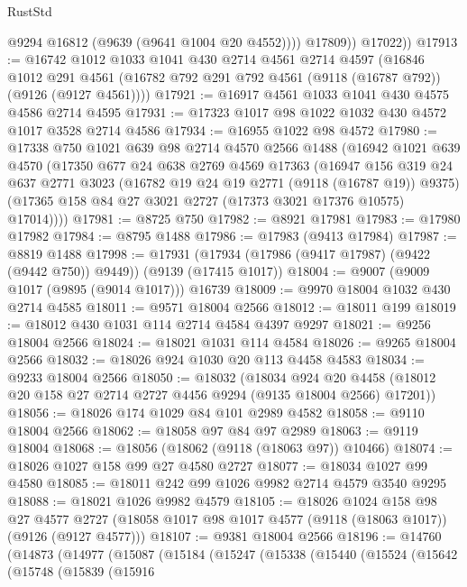 \begin{lexlean}{RustStd}
\begin{coremodule}
                @9294
                @16812
                (@9639 (@9641 @1004 @20 @4552))))
            @17809))
        @17022))
@17913 := @16742
    @1012
    @1033
    @1041
    @430
    @2714
    @4561
    @2714
    @4597
    (@16846
      @1012
      @291
      @4561
      (@16782 @792 @291 @792 @4561 (@9118 (@16787 @792)) (@9126 (@9127 @4561))))
@17921 := @16917 @4561 @1033 @1041 @430 @4575 @4586 @2714 @4595
@17931 := @17323 @1017 @98 @1022 @1032 @430 @4572 @1017 @3528 @2714 @4586
@17934 := @16955 @1022 @98 @4572
@17980 := @17338
    @750
    @1021
    @639
    @98
    @2714
    @4570
    @2566
    @1488
    (@16942
      @1021
      @639
      @4570
      (@17350
        @677
        @24
        @638
        @2769
        @4569
        @17363
        (@16947
          @156
          @319
          @24
          @637
          @2771
          @3023
          (@16782 @19 @24 @19 @2771 (@9118 (@16787 @19)) @9375)
          (@17365 @158 @84 @27 @3021 @2727 (@17373 @3021 @17376 @10575) @17014))))
@17981 := @8725 @750
@17982 := @8921 @17981
@17983 := @17980 @17982
@17984 := @8795 @1488
@17986 := @17983 (@9413 @17984)
@17987 := @8819 @1488
@17998 := @17931 (@17934 (@17986 (@9417 @17987) (@9422 (@9442 @750)) @9449)) (@9139 (@17415 @1017))
@18004 := @9007 (@9009 @1017 (@9895 (@9014 @1017))) @16739
@18009 := @9970 @18004 @1032 @430 @2714 @4585
@18011 := @9571 @18004 @2566
@18012 := @18011 @199
@18019 := @18012 @430 @1031 @114 @2714 @4584 @4397 @9297
@18021 := @9256 @18004 @2566
@18024 := @18021 @1031 @114 @4584
@18026 := @9265 @18004 @2566
@18032 := @18026 @924 @1030 @20 @113 @4458 @4583
@18034 := @9233 @18004 @2566
@18050 := @18032
    (@18034
      @924
      @20
      @4458
      (@18012 @20 @158 @27 @2714 @2727 @4456 @9294 (@9135 @18004 @2566) @17201))
@18056 := @18026 @174 @1029 @84 @101 @2989 @4582
@18058 := @9110 @18004 @2566
@18062 := @18058 @97 @84 @97 @2989
@18063 := @9119 @18004
@18068 := @18056 (@18062 (@9118 (@18063 @97)) @10466)
@18074 := @18026 @1027 @158 @99 @27 @4580 @2727
@18077 := @18034 @1027 @99 @4580
@18085 := @18011 @242 @99 @1026 @9982 @2714 @4579 @3540 @9295
@18088 := @18021 @1026 @9982 @4579
@18105 := @18026
    @1024
    @158
    @98
    @27
    @4577
    @2727
    (@18058 @1017 @98 @1017 @4577 (@9118 (@18063 @1017)) (@9126 (@9127 @4577)))
@18107 := @9381 @18004 @2566
@18196 := @14760
    (@14873
      (@14977
        (@15087
          (@15184
            (@15247
              (@15338
                (@15440
                  (@15524
                    (@15642
                      (@15748
                        (@15839
                          (@15916

\end{coremodule}
\end{lexlean}

